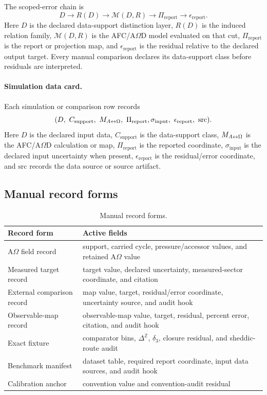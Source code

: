 The scoped-error chain is
\[
D\rightarrow R(D)\rightarrow \mathcal M(D,R)
\rightarrow \Pi_{\mathrm{report}}
\rightarrow \epsilon_{\mathrm{report}}.
\]
Here \(D\) is the declared data-support distinction layer, \(R(D)\) is the induced relation family, \(\mathcal M(D,R)\) is the AFC/A\(\Omega\)D model evaluated on that cut, \(\Pi_{\mathrm{report}}\) is the report or projection map, and \(\epsilon_{\mathrm{report}}\) is the residual relative to the declared output target. Every manual comparison declares its data-support class before residuals are interpreted.

\paragraph{Simulation data card.}
Each simulation or comparison row records
\[
(D,\ C_{\mathrm{support}},\ M_{\AO},\ \Pi_{\mathrm{report}},\sigma_{\mathrm{input}},\ \epsilon_{\mathrm{report}},\ \mathrm{src}).
\]
Here \(D\) is the declared input data, \(C_{\mathrm{support}}\) is the data-support class, \(M_{A{\leftrightarrow}\Omega}\) is the AFC/A\(\Omega\)D calculation or map, \(\Pi_{\mathrm{report}}\) is the reported coordinate, \(\sigma_{\mathrm{input}}\) is the declared input uncertainty when present, \(\epsilon_{\mathrm{report}}\) is the residual/error coordinate, and \(\mathrm{src}\) records the data source or source artifact.



\subsection{Manual record forms}\label{manual:record-forms}
\begin{table}[H]
\centering
\scriptsize
\caption{Manual record forms.}
\begin{tabularx}{\textwidth}{lX}
\toprule
Record form & Active fields\\
\midrule
A\(\Omega\) field record & support, carried cycle, pressure/accessor values, and retained A\(\Omega\) value\\
Measured target record & target value, declared uncertainty, measured-sector coordinate, and citation\\
External comparison record & map value, target, residual/error coordinate, uncertainty source, and audit hook\\
Observable-map record & observable-map value, target, residual, percent error, citation, and audit hook\\
Exact fixture & comparator bins, \(\Delta^{\mathbb Z}\), \(\delta_3\), closure residual, and sheddic-route audit\\
Benchmark manifest & dataset table, required report coordinate, input data sources, and audit hook\\
Calibration anchor & convention value and convention-audit residual\\
\bottomrule
\end{tabularx}
\label{tab:manual-record-forms}
\end{table}

\fi
